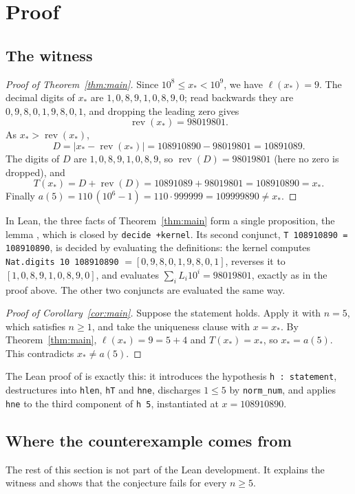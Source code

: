 \documentclass[11pt]{amsart}
\theoremstyle{plain}
\theoremstyle{definition}
\DeclareMathOperator{\rev}{rev}
\newcommand{\len}{\ell}
\newcommand{\xs}{x_{\ast}}
\begin{document}
\section{Proof}\label{sec:proof}

\subsection{The witness}
\begin{proof}[Proof of Theorem~\ref{thm:main}]
Since $10^8\le\xs<10^9$, we have $\len(\xs)=9$. The decimal digits of $\xs$ are $1,0,8,9,1,0,8,9,0$; read backwards they are $0,9,8,0,1,9,8,0,1$, and dropping the leading zero gives
\[
  \rev(\xs)=98019801 .
\]
As $\xs>\rev(\xs)$,
\[
  D=|\xs-\rev(\xs)|=108910890-98019801=10891089 .
\]
The digits of $D$ are $1,0,8,9,1,0,8,9$, so $\rev(D)=98019801$ (here no zero is dropped), and
\[
  T(\xs)=D+\rev(D)=10891089+98019801=108910890=\xs .
\]
Finally $a(5)=110\,(10^6-1)=110\cdot999999=109999890\ne\xs$.
\end{proof}

In Lean, the three facts of Theorem~\ref{thm:main} form a single proposition, the lemma , which is closed by \texttt{decide +kernel}. Its second conjunct, \texttt{T 108910890 = 108910890}, is decided by evaluating the definitions: the kernel computes \texttt{Nat.digits 10 108910890} $=[0,9,8,0,1,9,8,0,1]$, reverses it to $[1,0,8,9,1,0,8,9,0]$, and evaluates $\sum_i L_i10^i=98019801$, exactly as in the proof above. The other two conjuncts are evaluated the same way.

\begin{proof}[Proof of Corollary~\ref{cor:main}]
Suppose the statement holds. Apply it with $n=5$, which satisfies $n\ge1$, and take the uniqueness clause with $x=\xs$. By Theorem~\ref{thm:main}, $\len(\xs)=9=5+4$ and $T(\xs)=\xs$, so $\xs=a(5)$. This contradicts $\xs\ne a(5)$.
\end{proof}

The Lean proof of  is exactly this: it introduces the hypothesis \texttt{h : statement}, destructures  into \texttt{hlen}, \texttt{hT} and \texttt{hne}, discharges $1\le5$ by \texttt{norm\_num}, and applies \texttt{hne} to the third component of \texttt{h 5}, instantiated at $x=108910890$.

\subsection{Where the counterexample comes from}
The rest of this section is not part of the Lean development. It explains the witness and shows that the conjecture fails for every $n\ge5$.
\end{document}
